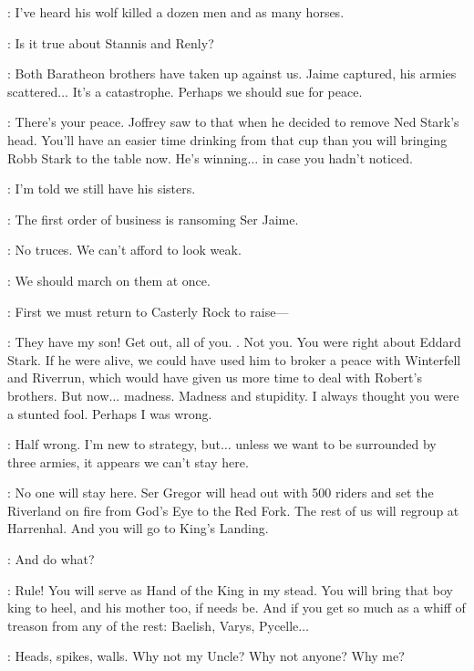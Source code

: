 \FIRSTLANNISTER: I've heard his wolf killed a dozen men and as many horses. 

\SECONDLANNISTER: Is it true about Stannis and Renly? 

\KEVAN: Both Baratheon brothers have taken up against us. Jaime captured, his armies scattered$\ldots$ It's a catastrophe. Perhaps we should sue for peace. 


\TYRION: There's your peace. Joffrey saw to that when he decided to remove Ned Stark's head. You'll have an easier time drinking from that cup than you will bringing Robb Stark to the table now. He's winning$\ldots$ in case you hadn't noticed. 

\KEVAN: I'm told we still have his sisters. 

\FIRSTLANNISTER: The first order of business is ransoming Ser Jaime. 

\SECONDLANNISTER: No truces. We can't afford to look weak. 

\FIRSTLANNISTER: We should march on them at once. 

\SECONDLANNISTER: First we must return to Casterly Rock to raise--- 

\TYWIN: They have my son! Get out, all of you. .  Not you. You were right about Eddard Stark. If he were alive, we could have used him to broker a peace with Winterfell and Riverrun, which would have given us more time to deal with Robert's brothers. But now$\ldots$ madness. Madness and stupidity. I always thought you were a stunted fool. Perhaps I was wrong. 

\TYRION: Half wrong. I'm new to strategy, but$\ldots$ unless we want to be surrounded by three armies, it appears we can't stay here. 

\TYWIN: No one will stay here. Ser Gregor will head out with 500 riders and set the Riverland on fire from God's Eye to the Red Fork. The rest of us will regroup at Harrenhal. And you will go to King's Landing. 

\TYRION: And do what? 

\TYWIN: Rule! You will serve as Hand of the King in my stead. You will bring that boy king to heel, and his mother too, if needs be. And if you get so much as a whiff of treason from any of the rest: Baelish, Varys, Pycelle$\ldots$  

\TYRION: Heads, spikes, walls. Why not my Uncle? Why not anyone? Why me? 

